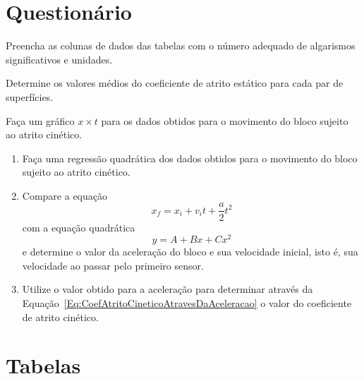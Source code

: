 \vspace{5mm}

\section{Questionário}

\begin{question}[type={exam}]
Preencha as colunas de dados das tabelas com o número adequado de algarismos significativos e unidades.
\end{question}

\begin{question}[type={exam}]
Determine os valores médios do coeficiente de atrito estático para cada par de superfícies.
\end{question}

\begin{question}[type={exam}]
Faça um gráfico $x \times t$ para os dados obtidos para o movimento do bloco sujeito ao atrito cinético.
\end{question}

\begin{question}[type={exam}]
\begin{enumerate}[label=\roman*.]
\item Faça uma regressão quadrática dos dados obtidos para o movimento do bloco sujeito ao atrito cinético.
\item Compare a equação
\begin{equation}
    x_f = x_i + v_i t + \frac{a}{2} t^2
\end{equation}
%
com a equação quadrática
\begin{equation}
    y = A + B x + C x^2
\end{equation}
%
e determine o valor da aceleração do bloco e sua velocidade inicial, isto é, sua velocidade ao passar pelo primeiro sensor.

\item Utilize o valor obtido para a aceleração para determinar através da Equação~\ref{Eq:CoefAtritoCineticoAtravesDaAceleracao} o valor do coeficiente de atrito cinético.
\end{enumerate}
\end{question}

\vfill
\pagebreak
\section{Tabelas}

